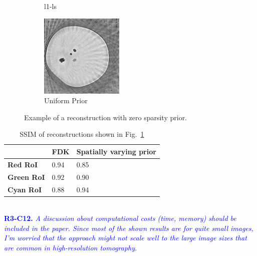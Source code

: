 \documentclass{article}
\begin{document}
\begin{figure}[!h]
\begin{subfigure}[b]{0.3\linewidth}
        \caption{l1-ls}
     \end{subfigure}
    \begin{subfigure}[b]{0.3\linewidth}
        \includegraphics[width=\textwidth]{../images/potato/cs_lambda_0/weightedPriorIm_green.png}
        \caption{Uniform Prior}
     \end{subfigure}
     \caption{Example of a reconstruction with zero sparsity prior.}
     \label{fig:potato_cs_lambda_0}
\end{figure}
\begin{table}[!h]
  \centering
  \caption{SSIM of reconstructions shown in Fig.~\ref{fig:potato_cs_lambda_0}}
\begin{tabular}{|l|l|l|}
\hline
 & \textbf{FDK} & \textbf{Spatially varying prior} \\ \hline
\textbf{Red RoI} & 0.94 & 0.85 \\ \hline
\textbf{Green RoI} & 0.92 & 0.90 \\ \hline
\textbf{Cyan RoI} & 0.88 & 0.94 \\ \hline
\end{tabular}
\end{table}\\

\textcolor{blue}{\textbf{R3-C12.}\textit{ A discussion about computational costs (time, memory) should be included in the paper. Since most of the shown results are for quite small images, I'm worried that the approach might not scale well to the large image sizes that are common in high-resolution tomography.   }}
\end{document}
